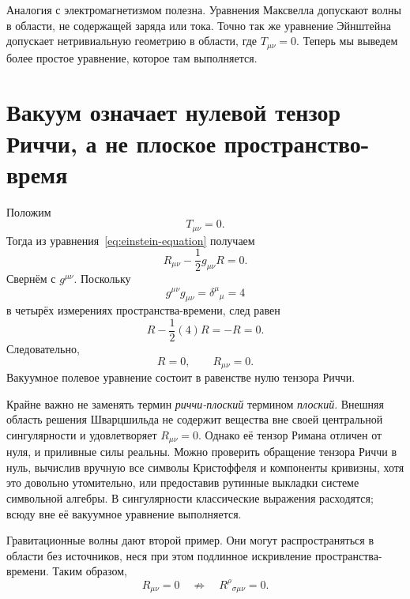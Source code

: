 Аналогия с электромагнетизмом полезна. Уравнения Максвелла допускают волны в области, не содержащей заряда или тока. Точно так же уравнение Эйнштейна допускает нетривиальную геометрию в области, где \(T_{\mu\nu}=0\). Теперь мы выведем более простое уравнение, которое там выполняется.

\section{Вакуум означает нулевой тензор Риччи, а не плоское пространство-время}

Положим
\begin{equation}
 T_{\mu\nu}=0.
\end{equation}
Тогда из уравнения~\eqref{eq:einstein-equation} получаем
\begin{equation}
 R_{\mu\nu}-\frac12g_{\mu\nu}R=0.
 \label{eq:vacuum-einstein}
\end{equation}
Свернём с \(g^{\mu\nu}\). Поскольку
\begin{equation}
 g^{\mu\nu}g_{\mu\nu}
 =\delta^\mu{}_\mu=4
\end{equation}
в четырёх измерениях пространства-времени, след равен
\begin{equation}
 R-\frac12(4)R=-R=0.
\end{equation}
Следовательно,
\begin{equation}
 R=0,
 \qquad
 R_{\mu\nu}=0.
 \label{eq:ricci-flat}
\end{equation}
Вакуумное полевое уравнение состоит в равенстве нулю тензора Риччи.

Крайне важно не заменять термин \emph{риччи-плоский} термином \emph{плоский}.
Внешняя область решения Шварцшильда не содержит вещества вне своей центральной сингулярности и удовлетворяет \(R_{\mu\nu}=0\). Однако её тензор Римана отличен от нуля, и приливные силы реальны. Можно проверить обращение тензора Риччи в нуль, вычислив вручную все символы Кристоффеля и компоненты кривизны, хотя это довольно утомительно, или предоставив рутинные выкладки системе символьной алгебры. В сингулярности классические выражения расходятся; всюду вне её вакуумное уравнение выполняется.

Гравитационные волны дают второй пример. Они могут распространяться в области без источников, неся при этом подлинное искривление пространства-времени. Таким образом,
\begin{equation}
 R_{\mu\nu}=0
 \quad\not\Rightarrow\quad
 R^\rho{}_{\sigma\mu\nu}=0.
\end{equation}

